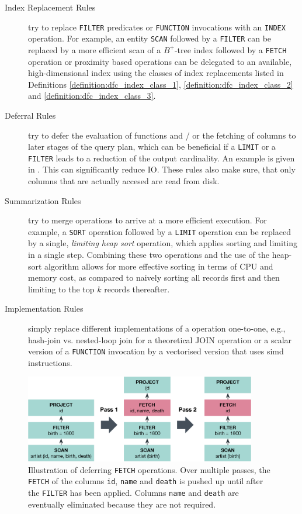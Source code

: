 \begin{description}
    \item[Index Replacement Rules] try to replace \texttt{FILTER} predicates or \texttt{FUNCTION} invocations with an  \texttt{INDEX} operation. For example, an entity \texttt{SCAN} followed by a \texttt{FILTER} can be replaced by a more efficient scan of a $B^{+}$-tree index followed by a \texttt{FETCH} operation or proximity based operations can be delegated to an available, high-dimensional index using the classes of index replacements listed in Definitions \ref{definition:dfc_index_class_1}, \ref{definition:dfc_index_class_2} and \ref{definition:dfc_index_class_3}.
 
    \item[Deferral Rules] try to defer the evaluation of functions and / or the fetching of columns to later stages of the query plan, which can be beneficial if a \texttt{LIMIT} or a \texttt{FILTER} leads to a reduction of the output cardinality. An example is given in . This can significantly reduce IO. These rules also make sure, that only columns that are actually accesed are read from disk.

    \item[Summarization Rules]try to merge operations to arrive at a more efficient execution. For example, a \texttt{SORT} operation followed by a  \texttt{LIMIT} operation can be replaced by a single, \emph{limiting heap sort} operation, which applies sorting and limiting in a single step. Combining these two operations and the use of the heap-sort algorithm allows for more effective sorting in terms of CPU and memory cost, as compared to naively sorting all records first and then limiting to the top $k$ records thereafter.
    
    \item[Implementation Rules] simply replace different implementations of a operation one-to-one, e.g., hash-join vs. nested-loop join for a theoretical JOIN operation or a scalar version of a \texttt{FUNCTION} invocation by a vectorised version that uses \acrshort{simd} instructions.
\end{description}


\begin{figure}[bt]
    \centering
    \includegraphics[width=0.9\textwidth]{figures/physical-rule-fetch}
    \caption{Illustration of deferring \texttt{FETCH} operations. Over multiple passes, the \texttt{FETCH} of the columns \texttt{id}, \texttt{name} and \texttt{death} is pushed up until after the \texttt{FILTER} has been applied. Columns \texttt{name} and \texttt{death} are eventually eliminated because they are not required.}
    \label{figure:cottontail_physical_rule_fetch}
\end{figure}

